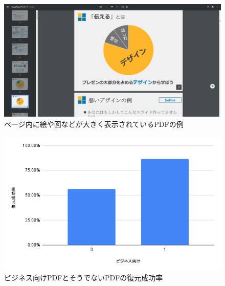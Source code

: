\begin{figure}[htbp]
  \caption{ページ内に絵や図などが大きく表示されているPDFの例}
  \label{fig:example-figure-pdf}
  \begin{center}
    \includegraphics[bb=0 0 1918 998,width=15cm]{img/060_evaluation/consideration/pdf/example/example-pdf.pdf}
  \end{center}
\end{figure}

\begin{figure}[htbp]
  \caption{ビジネス向けPDFとそうでないPDFの復元成功率}
  \label{fig:success-rate-business-or-not-pdf}
  \begin{center}
    \includegraphics[bb=0 0 600 371,width=15cm]{img/060_evaluation/consideration/pdf/success-rate-business-or-not-pdf.pdf}
  \end{center}
\end{figure}


